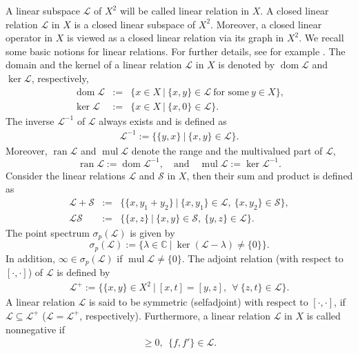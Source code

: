 \documentclass{birkjour}
\theoremstyle{definition}
\theoremstyle{remark}
\numberwithin{equation}{section}
\newcommand{\C}{\mathbb C}
\newcommand{\Ll}{\mathcal L}
\newcommand{\Ss}{\mathcal{S}}
\renewcommand{\geq}{\geqslant}
\DeclareMathOperator{\dom}{dom}
\DeclareMathOperator{\ran}{ran}
\DeclareMathOperator{\mul}{mul}
\begin{document}
A linear subspace $\Ll$ of $X^2$ will be called linear relation in $X$. A closed linear relation $\Ll$ in $X$ is a closed linear subspace of $X^2$. Moreover, a closed linear operator in $X$ is viewed as a closed linear relation via its graph in $X^2$. We recall some basic notions for linear relations. For further details, see for example \cite{A61,DS1,DS2, LT77}. The domain and the kernel of a linear relation $\Ll$ in $X$ is denoted  by $\dom\Ll$ and $\ker\Ll$, respectively, \begin{eqnarray*}
	\dom\Ll&:= &\{x\in X ~ |~ \{x,y\} \in \Ll ~ \text{for some} ~ y\in X\},\\
	\ker\Ll&:= &\{x\in X ~ |~ \{x,0\} \in \Ll\}. \end{eqnarray*}
The inverse $\Ll^{-1}$ of $\Ll$ always exists and is defined as
\begin{align*}
    \Ll^{-1} :=\{\{y,x\}~|~  \{x,y\} \in \Ll \}.
\end{align*}
Moreover, $\ran\Ll$ and $\mul\Ll$ denote the range and the multivalued part of $\Ll$, 
$$
    \ran\Ll:= \dom \Ll^{-1},\quad \mbox{and} \quad
	\mul\Ll:= \ker \Ll^{-1}.
$$
Consider the linear relations $\Ll$ and $\Ss$ in $X$, then their sum and product is defined as
\begin{eqnarray*}
    \Ll+ \Ss &:=&\{\{x,y_1+y_2\}~|~ \{x,y_1\} \in \Ll, \ \{x,y_2\} \in \Ss \}, \\
    \Ll \Ss &:=&\{\{x,z\}~|~  \{x,y\} \in \Ss, \ \{y,z\} \in \Ll \}.
\end{eqnarray*}
The point spectrum $\sigma_p(\Ll)$ is given by
\[
\sigma_p(\Ll):=\{\lambda\in\C~|~ \ker(\Ll - \lambda)\neq\{0\}\}.
\] In addition, $\infty\in\sigma_p(\Ll)$ if $\mul \Ll \neq \{0\}.$
The adjoint relation (with respect to $[\cdot, \cdot]$) of $\Ll$ is defined by
\begin{align*}
    \mathcal{L}^{+}:=\{\{x,y\}\in X^2~|~ [x,t]=[y,z], \ \ \forall\ \{z,t\} \in \mathcal{L} \}.
    \end{align*}
A linear relation $\Ll$ is said to be symmetric (selfadjoint) with respect to $[\cdot, \cdot]$, if $\Ll \subseteq \Ll^{+}$
($\Ll = \Ll^{+}$, respectively). Furthermore, a linear relation $\mathcal{L}$ in $X$ is called nonnegative if \begin{align*}
    [f',f]\geq 0, \ \ \{f,f'\}\in \mathcal{L}.
\end{align*}
\end{document}
